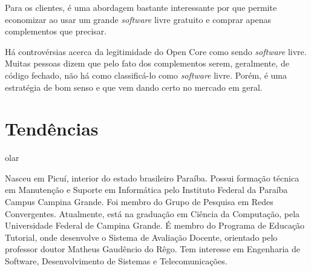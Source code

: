 \documentclass{classe_cn}                 %
\begin{document}
Para os clientes, é uma abordagem bastante interessante por que permite economizar ao usar um grande \textit{software} livre gratuito e comprar apenas complementos que precisar.

Há controvérsias acerca da legitimidade do Open Core como sendo \textit{software} livre. Muitas pessoas dizem que pelo fato dos complementos serem, geralmente, de código fechado, não há como classificá-lo como \textit{software} livre. Porém, é uma estratégia de bom senso e que vem dando certo no mercado em geral.

\section{Tendências}

olar



\vspace{1.0cm}
  Nasceu em Picuí, interior do estado brasileiro Paraíba. Possui formação técnica em Manutenção e Suporte em Informática pelo Instituto Federal da Paraíba Campus Campina Grande. Foi membro do Grupo de Pesquisa em Redes Convergentes. Atualmente, está na graduação em Ciência da Computação, pela Universidade Federal de Campina Grande. É membro do Programa de Educação Tutorial, onde desenvolve o Sistema de Avaliação Docente, orientado pelo professor doutor Matheus Gaudêncio do Rêgo. Tem interesse em Engenharia de Software, Desenvolvimento de Sistemas e Telecomunicações.  
\end{document}
